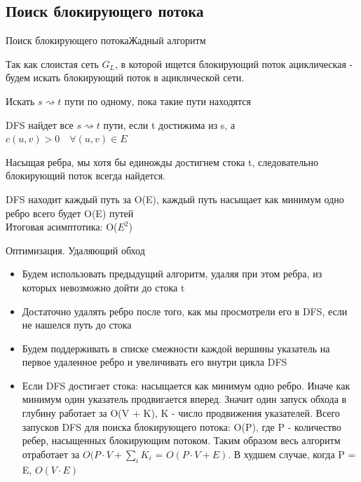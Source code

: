 \documentclass{beamer}
\begin{document}
\subsection{Поиск блокирующего потока}
\begin{frame}{Поиск блокирующего потока}{Жадный алгоритм}
    \begin{itemize}
        \item {
            Так как слоистая сеть $G_{L}$, в которой ищется блокирующий поток ациклическая - будем искать блокирующий поток в ациклической сети.
        }
        \item Искать $s \rightsquigarrow t$ пути по одному, пока такие пути находятся
        \item DFS найдет все $s \rightsquigarrow t$ пути, если t достижима из s, а $c(u, v) > 0 \quad \forall (u, v) \in E$
        \item { Насыщая ребра, мы хотя бы единожды достигнем стока t, следовательно блокирующий поток всегда найдется. 
        \item DFS находит каждый путь за O(E), каждый путь насыщает как минимум одно ребро \Rightarrow всего будет O(E) путей\\
        Итоговая асимптотика: O($E^2$)
        }
    \end{itemize}
\end {frame}

\begin{frame}{Оптимизация. Удаляющий обход}
    \begin{itemize}
        \item Будем использовать предыдущий алгоритм, удаляя при этом ребра, из которых невозможно дойти до стока t
        \pause
        \item Достаточно удалять ребро после того, как мы просмотрели его в DFS, если не нашелся путь до стока
        \pause
        \item Будем поддерживать в списке смежности каждой вершины указатель на первое удаленное ребро и увеличивать его внутри цикла DFS
        \pause
        \item Если DFS достигает стока: насыщается как минимум одно ребро. Иначе как минимум один указатель продвигается вперед. Значит один запуск обхода в глубину работает за O(V + K), K - число продвижения указателей. 
        Всего запусков DFS для поиска блокирующего потока: O(P), где P - количество ребер, насыщенных блокирующим потоком.
        Таким образом весь алгоритм отработает за $O(P \cdot V + \sum_{i} K_{i} $ = $O(P \cdot V + E)$. В худшем случае, когда P = E, $O(V \cdot E)$
    \end{itemize}
\end{frame}
\end{document}
